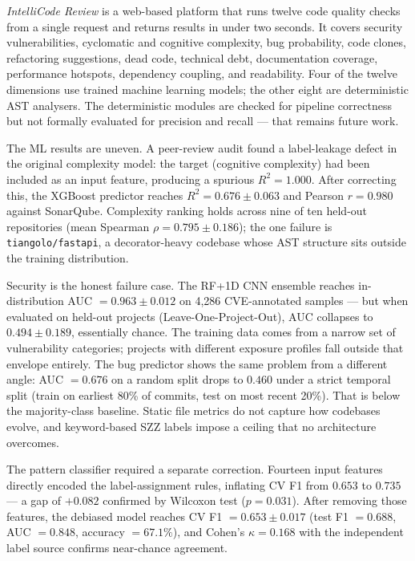 \documentclass[12pt, oneside]{report}
\begin{document}
\textit{IntelliCode Review} is a web-based platform that runs twelve code quality checks from a single request and returns results in under two seconds. It covers security vulnerabilities, cyclomatic and cognitive complexity, bug probability, code clones, refactoring suggestions, dead code, technical debt, documentation coverage, performance hotspots, dependency coupling, and readability. Four of the twelve dimensions use trained machine learning models; the other eight are deterministic AST analysers. The deterministic modules are checked for pipeline correctness but not formally evaluated for precision and recall — that remains future work.

The ML results are uneven. A peer-review audit found a label-leakage defect in the original complexity model: the target (cognitive complexity) had been included as an input feature, producing a spurious $R^2 = 1.000$. After correcting this, the XGBoost predictor reaches $R^2 = 0.676 \pm 0.063$ and Pearson $r = 0.980$ against SonarQube. Complexity ranking holds across nine of ten held-out repositories (mean Spearman $\rho = 0.795 \pm 0.186$); the one failure is \texttt{tiangolo/fastapi}, a decorator-heavy codebase whose AST structure sits outside the training distribution.

Security is the honest failure case. The RF+1D CNN ensemble reaches in-distribution AUC $= 0.963 \pm 0.012$ on 4,286 CVE-annotated samples — but when evaluated on held-out projects (Leave-One-Project-Out), AUC collapses to $0.494 \pm 0.189$, essentially chance. The training data comes from a narrow set of vulnerability categories; projects with different exposure profiles fall outside that envelope entirely. The bug predictor shows the same problem from a different angle: AUC $= 0.676$ on a random split drops to $0.460$ under a strict temporal split (train on earliest 80\% of commits, test on most recent 20\%). That is below the majority-class baseline. Static file metrics do not capture how codebases evolve, and keyword-based SZZ labels impose a ceiling that no architecture overcomes.

The pattern classifier required a separate correction. Fourteen input features directly encoded the label-assignment rules, inflating CV F1 from $0.653$ to $0.735$ — a gap of $+0.082$ confirmed by Wilcoxon test ($p = 0.031$). After removing those features, the debiased model reaches CV F1 $= 0.653 \pm 0.017$ (test F1 $= 0.688$, AUC $= 0.848$, accuracy $= 67.1\%$), and Cohen's $\kappa = 0.168$ with the independent label source confirms near-chance agreement.
\end{document}

